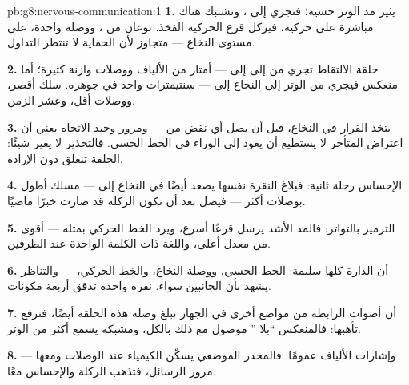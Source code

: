 \begin{solution}{pb:g8:nervous-communication:1}
\textbf{1.} يثير مد الوتر  حسية؛ فتجري إلى
\emph{}، وتشتبك هناك مباشرة على 
حركية، فيركل قرع الحركية  الفخذ. نوعان من
، ووصلة واحدة، على مستوى النخاع --- 
متجاوز لأن الحماية لا تنتظر التداول.

\textbf{2.} حلقة الالتقاط تجري من  إلى  إلى
 --- أمتار من الألياف ووصلات وازنة كثيرة؛ أما
منعكس  فيجري من الوتر إلى النخاع إلى  ---
سنتيمترات  واحد في جوهره. سلك أقصر، ووصلات أقل،
وعشر الزمن.

\textbf{3.} يتخذ القرار في النخاع، قبل أن يصل أي نقض من
 --- ومرور  وحيد الاتجاه يعني أن اعتراض
 المتأخر لا يستطيع أن يعود إلى الوراء في الخط
الحسي. فالتحذير لا يغير شيئًا: الحلقة تنغلق دون الإرادة.

\textbf{4.} الإحساس رحلة ثانية: فبلاغ النقرة نفسها يصعد
أيضًا في النخاع إلى  --- مسلك أطول بوصلات أكثر ---
فيصل بعد أن تكون الركلة قد صارت خبرًا ماضيًا.

\textbf{5.} الترميز بالتواتر: فالمد الأشد يرسل قرعًا
أسرع، ويرد الخط الحركي بمثله ---  أقوى من معدل
أعلى، واللغة ذات الكلمة الواحدة عند الطرفين.

\textbf{6.} أن الدارة كلها سليمة: الخط الحسي، ووصلة
النخاع، والخط الحركي،  --- والتناظر يشهد بأن
الجانبين سواء. نقرة واحدة تدقق أربعة مكونات.

\textbf{7.} أن أصوات  الرابطة من مواضع أخرى في
الجهاز تبلغ وصلة هذه الحلقة أيضًا، فترفع تأهبها:
فالمنعكس ``بلا '' موصول مع ذلك بالكل، ومشبكه يسمع
أكثر من الوتر.

\textbf{8.}  --- وإشارات الألياف عمومًا: فالمخدر
الموضعي يسكّن الكيمياء عند الوصلات ومعها مرور الرسائل،
فتذهب الركلة والإحساس معًا.


\end{solution}
